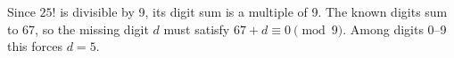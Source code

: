 Since $25!$ is divisible by 9, its digit sum is a multiple of 9. The known digits sum to 67, so the missing digit $d$ must satisfy $67+d\equiv0\pmod9$. Among digits 0--9 this forces $\boxed{d=5}$.
